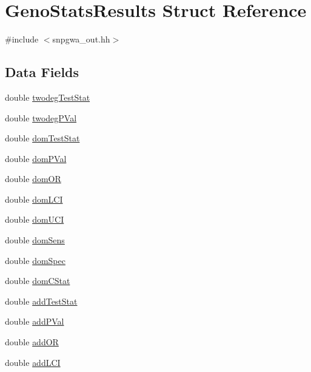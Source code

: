 \hypertarget{structGenoStatsResults}{
\section{GenoStatsResults Struct Reference}
\label{structGenoStatsResults}
}


{\ttfamily \#include $<$snpgwa\_\-out.hh$>$}

\subsection*{Data Fields}
\begin{DoxyCompactItemize}
\item 
double \hyperlink{structGenoStatsResults_a8939e18575bccc8154ee9dd919ce8b90}{twodegTestStat}
\item 
double \hyperlink{structGenoStatsResults_a5de1f45e02308c33f2030392d55a664d}{twodegPVal}
\item 
double \hyperlink{structGenoStatsResults_a26abd8c399efc11a7814df9afd31458c}{domTestStat}
\item 
double \hyperlink{structGenoStatsResults_ad91040dfe4d9a55dc55db1399d0c0d12}{domPVal}
\item 
double \hyperlink{structGenoStatsResults_a8fe0e46c762b32b2b30f8ca36c8e9175}{domOR}
\item 
double \hyperlink{structGenoStatsResults_ab01b69964f41f4dd90a04a09ea14cd8e}{domLCI}
\item 
double \hyperlink{structGenoStatsResults_aef952f406558e7069bc0f5018c19ede3}{domUCI}
\item 
double \hyperlink{structGenoStatsResults_a37f7461f9e3f2985f5e3e31e068efda5}{domSens}
\item 
double \hyperlink{structGenoStatsResults_a3a84dcdd77bcce6a1c0e828508caeb71}{domSpec}
\item 
double \hyperlink{structGenoStatsResults_a317b7bb7d082eb5f277b175a3cd59f26}{domCStat}
\item 
double \hyperlink{structGenoStatsResults_ab488fd76b2583fae71b015f3dc36bcd2}{addTestStat}
\item 
double \hyperlink{structGenoStatsResults_a33e9c29e3701709217756dadcec9e43d}{addPVal}
\item 
double \hyperlink{structGenoStatsResults_a789a736b74e427c069ce2cf4642fe465}{addOR}
\item 
double \hyperlink{structGenoStatsResults_ada26e3e65a779adf42d6598df522f22c}{addLCI}
\item 

\end{DoxyCompactItemize}
